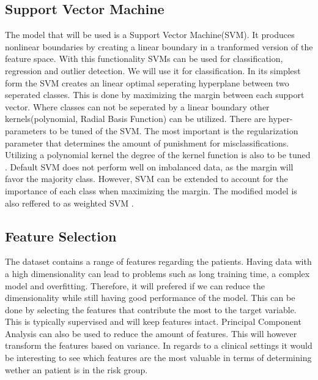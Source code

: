 \subsection{Support Vector Machine}
The model that will be used is a Support Vector Machine(SVM). It produces nonlinear boundaries by creating a linear boundary in a tranformed version of the feature space. With this functionality SVMs can be used for classification, regression and outlier detection. We will use it for classification. In its simplest form the SVM creates an linear optimal seperating hyperplane between two seperated classes. This is done by maximizing the margin between each support vector. Where classes can not be seperated by a linear boundary other kernels(polynomial, Radial Basis Function) can be utilized. There are hyper-parameters to be tuned of the SVM. The most important is the regularization parameter that determines the amount of punishment for misclassifications. Utilizing a polynomial kernel the degree of the kernel function is also to be tuned \cite*{statistical-book}. Default SVM does not perform well on imbalanced data, as the margin will favor the majority class. However, SVM can be extended to account for the  importance of each class when maximizing the margin. The modified model is also reffered to as weighted SVM \cite*{svm-imbalanced-data}.
   
\subsection{Feature Selection}
The dataset contains a range of features regarding the patients. Having data with a high dimensionality can lead to problems such as long training time, a complex model and overfitting. Therefore, it will prefered if we can reduce the dimensionality while still having good performance of the model. This can be done by selecting the features that contribute the most to the target variable. This is typically supervised and will keep features intact. Principal Component Analysis can also be used to reduce the amount of features. This will however transform the features based on variance. In regards to a clinical settings it would be interesting to see which features are the most valuable in terms of determining wether an patient is in the risk group.
